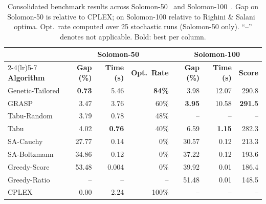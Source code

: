 \begin{table}[htbp]
\centering
\caption{Consolidated benchmark results across Solomon-50~\cite{solomon50} and
         Solomon-100~\cite{solomon100}. Gap on Solomon-50 is relative to CPLEX; on Solomon-100
         relative to Righini \& Salani~\cite{righini_salani} optima. Opt.\ rate computed over
         25 stochastic runs (Solomon-50 only). ``--'' denotes not applicable. Bold: best per column.}
\label{tab:combined}
\small
\setlength{\tabcolsep}{4.5pt}
\renewcommand{\arraystretch}{1.10}
\begin{tabular}{l rr r rr r}
\toprule
 & \multicolumn{3}{c}{\textbf{Solomon-50}} & \multicolumn{3}{c}{\textbf{Solomon-100}} \\
\cmidrule(lr){2-4}\cmidrule(lr){5-7}
\textbf{Algorithm}
  & \textbf{Gap (\%)} & \textbf{Time (s)} & \textbf{Opt.\ Rate}
  & \textbf{Gap (\%)} & \textbf{Time (s)} & \textbf{Score} \\
\midrule
Genetic-Tailored  & \textbf{0.73}  & 5.46           & \textbf{84\%}  & 3.98           & 12.07          & 290.8          \\
GRASP             & 3.47           & 3.76           & 60\%           & \textbf{3.95}  & 10.58          & \textbf{291.5} \\
Tabu-Random       & 3.79           & 0.78           & 48\%           & --             & --             & --             \\
Tabu              & 4.02           & \textbf{0.76}  & 40\%           & 6.59           & \textbf{1.15}  & 282.3          \\
SA-Cauchy         & 27.77          & 0.14           & 0\%            & 30.57          & 0.12           & 213.3          \\
SA-Boltzmann      & 34.86          & 0.12           & 0\%            & 37.22          & 0.12           & 193.6          \\
Greedy-Score      & 53.48          & 0.004          & 0\%            & 39.92          & 0.01           & 186.4          \\
Greedy-Ratio      & --             & --             & --             & 51.48          & 0.01           & 148.5          \\
CPLEX             & 0.00           & 2.24           & 100\%          & --             & --             & --             \\
\bottomrule
\end{tabular}
\end{table}

